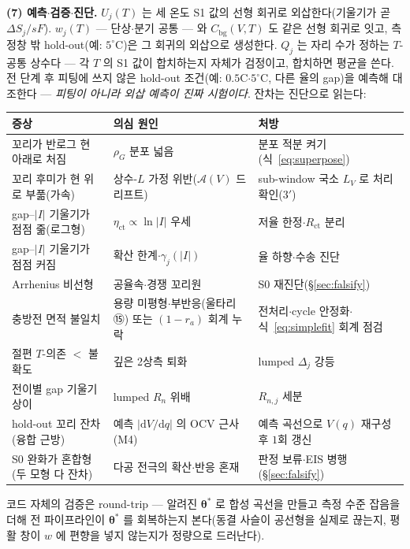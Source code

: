 \documentclass[11pt,a4paper]{article}
\newcommand{\dd}{\mathrm{d}}
\newcommand{\bg}{\mathrm{bg}}
\begin{document}
\textbf{(7) 예측$\cdot$검증$\cdot$진단.} $U_j(T)$ 는 세 온도 S1 값의 선형 회귀로 외삽한다(기울기가
곧 $\Delta S_j/sF$). $w_j(T)$ — 단상$\cdot$분기 공통 — 와 $C_\bg(V,T)$ 도 같은 선형 회귀로 잇고,
측정창 밖 hold-out(예: $5^\circ$C)은 그 회귀의 외삽으로 생성한다. $Q_j$ 는 자리 수가 정하는
$T$-공통 상수다 — 각 $T$ 의 S1 값이 합치하는지 자체가 검정이고, 합치하면 평균을 쓴다. 전 단계 후 피팅에 쓰지
않은 hold-out 조건(예: $0.5$C$\cdot$$5^\circ$C, 다른 율의 gap)을 예측해 대조한다 — \emph{피팅이 아니라
외삽 예측이 진짜 시험이다}. 잔차는 진단으로 읽는다:
\begin{center}
\renewcommand{\arraystretch}{1.3}
\begin{tabular}{p{} p{} p{}}
\toprule
증상 & 의심 원인 & 처방 \\
\midrule
꼬리가 반로그 현 아래로 처짐 & $\rho_G$ 분포 넓음 & 분포 적분 켜기(식~\eqref{eq:superpose}) \\
꼬리 후미가 현 위로 부풂(가속) & 상수-$L$ 가정 위반($\mathcal A(V)$ 드리프트) & sub-window 국소 $L_V$ 로 처리 확인(3$'$) \\
gap--$|I|$ 기울기가 점점 줆(로그형) & $\eta_{\mathrm{ct}}\propto\ln|I|$ 우세 & 저율 한정$\cdot$$R_{\mathrm{ct}}$ 분리 \\
gap--$|I|$ 기울기가 점점 커짐 & 확산 한계$\cdot$$\gamma_j(|I|)$ & 율 하향$\cdot$수송 진단 \\
Arrhenius 비선형 & 공율속$\cdot$경쟁 꼬리원 & S0 재진단(\S\ref{sec:falsify}) \\
충방전 면적 불일치 & 용량 미평형$\cdot$부반응(울타리 ⑮) 또는 $(1{-}r_a)$ 회계 누락 & 전처리$\cdot$cycle 안정화$\cdot$식~\eqref{eq:simplefit} 회계 점검 \\
절편 $T$-의존 $<$ 불확도 & 깊은 2상측 퇴화 & lumped $\Delta_j$ 강등 \\
전이별 gap 기울기 상이 & lumped $R_n$ 위배 & $R_{n,j}$ 세분 \\
hold-out 꼬리 잔차(융합 근방) & 예측 $|\dd V/\dd q|$ 의 OCV 근사(M4) & 예측 곡선으로 $V(q)$ 재구성 후 $1$회 갱신 \\
S0 완화가 혼합형(두 모형 다 잔차) & 다공 전극의 확산$\cdot$반응 혼재 & 판정 보류$\cdot$EIS 병행(\S\ref{sec:falsify}) \\
\bottomrule
\end{tabular}
\end{center}
코드 자체의 검증은 round-trip — 알려진 $\bm\theta^\ast$ 로 합성 곡선을 만들고 측정 수준 잡음을 더해 전
파이프라인이 $\bm\theta^\ast$ 를 회복하는지 본다(동결 사슬이 공선형을 실제로 끊는지, 평활 창이 $w$ 에
편향을 넣지 않는지가 정량으로 드러난다).
\end{document}
